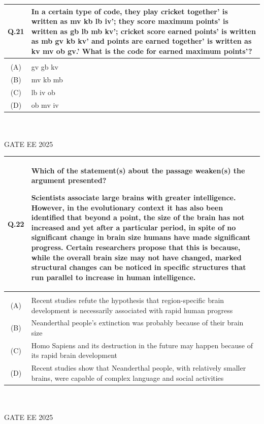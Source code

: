\documentclass[journal,12pt,onecolumn]{IEEEtran}
\theoremstyle{remark}
\begin{document}
\begin{tabular}{|c|p{16cm}|}\hline
   Q.21 & In a certain type of code, they play cricket together' is written as mv kb lb iv'; they score maximum points' is written as gb lb mb kv'; cricket score earned points' is written as mb gv kb kv' and points are earned together' is written as kv mv ob gv.' \newline
What is the code for earned maximum points'?
\\   \hline
     & \\    \hline
  (A) &  gv gb kv\\     \hline
  (B) & mv kb mb \\  \hline
  (C) & lb iv ob\\  \hline
  (D) & ob mv iv\\  \hline
\end{tabular} ~\\ \\
GATE EE 2025\\

\begin{tabular}{|c|p{16cm}|}\hline
   Q.22 & Which of the statement(s) about the passage weaken(s) the argument presented? \newline

Scientists associate large brains with greater intelligence. However, in the evolutionary context it has also been identified that beyond a point, the size of the brain has not increased and yet after a particular period, in spite of no significant change in brain size humans have made significant progress. Certain researchers propose that this is because, while the overall brain size may not have changed, marked structural changes can be noticed in specific structures that run parallel to increase in human intelligence. \\   \hline
     & \\    \hline
  (A) & Recent studies refute the hypothesis that region-specific brain development is
necessarily associated with rapid human progress \\     \hline
  (B) & Neanderthal people’s extinction was probably because of their brain size\\  \hline
  (C) & Homo Sapiens and its destruction in the future may happen because of its rapid
brain development\\  \hline
  (D) & Recent studies show that Neanderthal people, with relatively smaller brains, were
capable of complex language and social activities\\  \hline
\end{tabular} ~\\ \\
GATE EE 2025\\
\end{document}
